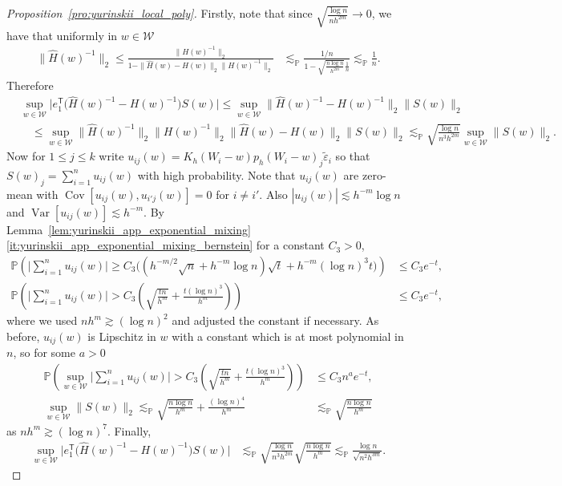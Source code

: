 \documentclass[11pt,lof]{puthesis}
\renewcommand{\P}{\ensuremath{\mathbb{P}}}
\newcommand{\cW}{\ensuremath{\mathcal{W}}}
\newcommand{\T}{\ensuremath{\mathsf{T}}}
\DeclareMathOperator{\Var}{Var}
\DeclareMathOperator{\Cov}{Cov}
\theoremstyle{break}
\theoremstyle{proof}
\newtheorem{proof}{Proof}
\begin{document}
\begin{proof}[Proposition~\ref{pro:yurinskii_local_poly}]
Firstly, note that
since $\sqrt{\frac{\log n}{n h^{2m}}} \to 0$,
we have that uniformly in $w \in \cW$
%
\begin{align*}
\|\hat H(w)^{-1}\|_2
\leq
\frac{\|H(w)^{-1}\|_2}
{1 - \|\hat H(w)-H(w)\|_2 \|H(w)^{-1}\|_2}
&\lesssim_\P
\frac{1/n}
{1 - \sqrt{\frac{n \log n}{h^{2m}}} \frac{1}{n}}
\lesssim_\P
\frac{1}{n}.
\end{align*}
%
Therefore
%
\begin{align*}
&\sup_{w \in \cW}
\big|
e_1^\T \big(\hat H(w)^{-1} - H(w)^{-1}\big)
S(w)
\big|
\leq
\sup_{w \in \cW}
\big\|\hat H(w)^{-1} - H(w)^{-1}\big\|_2
\|S(w)\|_2 \\
&\quad\leq
\sup_{w \in \cW}
\big\|\hat H(w)^{-1}\big\|_2
\big\|H(w)^{-1}\big\|_2
\big\|\hat H(w) - H(w)\big\|_2
\|S(w)\|_2
\lesssim_\P
\sqrt{\frac{\log n}{n^3 h^{2m}}}
\sup_{w \in \cW}
\|S(w)\|_2.
\end{align*}
%
Now for $1 \leq j \leq k$ write
$u_{i j}(w) = K_h(W_i-w) p_h(W_i-w)_j \tilde \varepsilon_i$
so that $S(w)_j = \sum_{i=1}^n u_{i j}(w)$ with high probability.
Note that $u_{i j}(w)$ are zero-mean with
$\Cov[u_{i j}(w), u_{i' j}(w)] = 0$ for $ i \neq i'$.
Also $|u_{i j}(w)| \lesssim h^{-m} \log n$
and $\Var[u_{i j}(w)] \lesssim h^{-m}$.
By Lemma~\ref{lem:yurinskii_app_exponential_mixing}%
\ref{it:yurinskii_app_exponential_mixing_bernstein}
for a constant $C_3>0$,
%
\begin{align*}
\P\left(
\Big| \sum_{i=1}^n u_{i j}(w) \Big|
\geq C_3 \big( (h^{-m/2} \sqrt n + h^{-m} \log n) \sqrt t
+ h^{-m} (\log n)^3 t \big)
\right)
&\leq
C_3 e^{-t}, \\
\P\left(
\Big| \sum_{i=1}^n u_{i j}(w) \Big|
>
C_3 \left(
\sqrt{\frac{tn}{h^{m}}}
+ \frac{t(\log n)^3}{h^{m}}
\right)
\right)
&\leq
C_3 e^{-t},
\end{align*}
%
where we used $n h^{m} \gtrsim (\log n)^2$
and adjusted the constant if necessary.
As before,
$u_{i j}(w)$ is Lipschitz in $w$ with a constant which is at most
polynomial in $n$,
so for some $a>0$
%
\begin{align*}
\P\left(
\sup_{w \in \cW}
\Big| \sum_{i=1}^n u_{i j}(w) \Big|
>
C_3 \left(
\sqrt{\frac{tn}{h^{m}}}
+ \frac{t(\log n)^3}{h^{m}}
\right)
\right)
&\leq
C_3 n^a e^{-t}, \\
\sup_{w \in \cW}
\|S(w)\|_2
\lesssim_\P
\sqrt{\frac{n \log n}{h^{m}}}
+ \frac{(\log n)^4}{h^{m}}
&\lesssim_\P
\sqrt{\frac{n \log n}{h^{m}}}
\end{align*}
%
as $n h^m \gtrsim (\log n)^7$.
Finally,
%
\begin{align*}
\sup_{w \in \cW}
\big|
e_1^\T \big(\hat H(w)^{-1} - H(w)^{-1}\big)
S(w)
\big|
&\lesssim_\P
\sqrt{\frac{\log n}{n^3 h^{2m}}}
\sqrt{\frac{n \log n}{h^{m}}}
\lesssim_\P
\frac{\log n}{\sqrt{n^2 h^{3m}}}.
\end{align*}


\end{proof}
\end{document}
